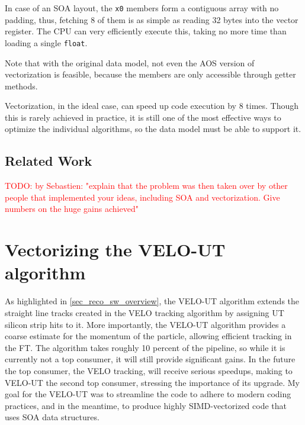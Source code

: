 \documentclass[12pt]{article}
\newcommand{\code}[1]{\texttt{#1}}
\begin{document}
In case of an SOA layout, the \code{x0} members form a contiguous array with no padding, thus, fetching 8 of them is as simple as reading 32 bytes into the vector register. The CPU can very efficiently execute this, taking no more time than loading a single \code{float}.

Note that with the original data model, not even the AOS version of vectorization is feasible, because the members are only accessible through getter methods.

Vectorization, in the ideal case, can speed up code execution by 8 times. Though this is rarely achieved in practice, it is still one of the most effective ways to optimize the individual algorithms, so the data model must be able to support it.


\subsection{Related Work}

\textcolor{red}{TODO: by Sebastien: "explain that the problem was then taken over by other people that implemented your ideas, including SOA and vectorization. Give numbers on the huge gains achieved"}


\newpage
\section{Vectorizing the VELO-UT algorithm}\label{sec_opt_velout}

As highlighted in \ref{sec_reco_sw_overview}, the VELO-UT algorithm extends the straight line tracks created in the VELO tracking algorithm by assigning UT silicon strip hits to it. More importantly, the VELO-UT algorithm provides a coarse estimate for the momentum of the particle, allowing efficient tracking in the FT.
The algorithm takes roughly 10 percent of the pipeline, so while it is currently not a top consumer, it will still provide significant gains. In the future the top consumer, the VELO tracking, will receive serious speedups, making to VELO-UT the second top consumer, stressing the importance of its upgrade. My goal for the VELO-UT was to streamline the code to adhere to modern coding practices, and in the meantime, to produce highly SIMD-vectorized code that uses SOA data structures.
\end{document}
